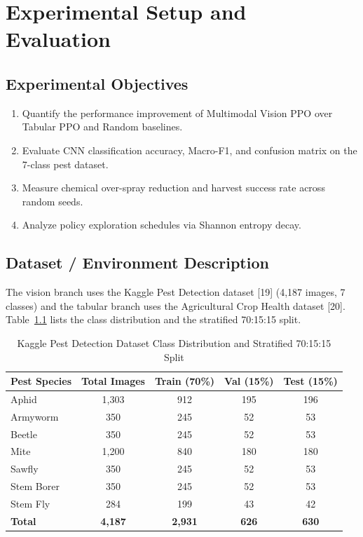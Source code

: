 \documentclass[12pt,a4paper]{report}
\begin{document}
\chapter{Experimental Setup and Evaluation}

\section{Experimental Objectives}
\begin{enumerate}
    \item Quantify the performance improvement of Multimodal Vision PPO over Tabular PPO and Random baselines.
    \item Evaluate CNN classification accuracy, Macro-F1, and confusion matrix on the 7-class pest dataset.
    \item Measure chemical over-spray reduction and harvest success rate across random seeds.
    \item Analyze policy exploration schedules via Shannon entropy decay.
\end{enumerate}

\section{Dataset / Environment Description}
The vision branch uses the Kaggle Pest Detection dataset [19] (4,187 images, 7 classes) and the tabular branch uses the Agricultural Crop Health dataset [20]. Table~\ref{tab:pest_dataset} lists the class distribution and the stratified 70:15:15 split.

\begin{table}[H]
\centering
\caption{Kaggle Pest Detection Dataset Class Distribution and Stratified 70:15:15 Split}
\label{tab:pest_dataset}
\begin{tabular}{lcccc}
\toprule
\textbf{Pest Species} & \textbf{Total Images} & \textbf{Train (70\%)} & \textbf{Val (15\%)} & \textbf{Test (15\%)} \\
\midrule
Aphid & 1,303 & 912 & 195 & 196 \\
Armyworm & 350 & 245 & 52 & 53 \\
Beetle & 350 & 245 & 52 & 53 \\
Mite & 1,200 & 840 & 180 & 180 \\
Sawfly & 350 & 245 & 52 & 53 \\
Stem Borer & 350 & 245 & 52 & 53 \\
Stem Fly & 284 & 199 & 43 & 42 \\
\midrule
\textbf{Total} & \textbf{4,187} & \textbf{2,931} & \textbf{626} & \textbf{630} \\
\bottomrule
\end{tabular}
\end{table}
\end{document}
